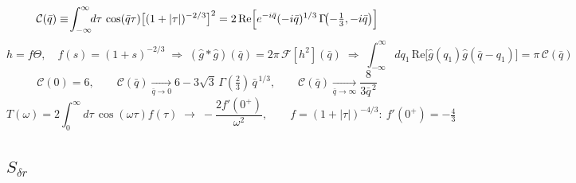 \documentclass[10pt,prd,aps,nobibnotes,superscriptaddress,preprintnumbers,notitlepage]{revtex4-1}
\begin{document}
\begin{equation}
  \mathcal{C}(\bar q)\equiv\!\int_{-\infty}^{\infty}\!\!d\tau\,\cos(\bar q\tau)
  \bigl[(1+|\tau|)^{-2/3}\bigr]^{2}
  =2\,\mathrm{Re}\Bigl[e^{-i\bar q}(-i\bar q)^{1/3}\,\Gamma\!\bigl(-\tfrac13,-i\bar q\bigr)\Bigr]
  \label{A:Cclosed}
\end{equation}
\begin{equation}
  h=f\Theta,\quad f(s)=(1+s)^{-2/3}
  \;\Longrightarrow\;
  (\hat g*\hat g)(\bar q)=2\pi\,\mathcal{F}[h^2](\bar q)
  \;\Longrightarrow\;
  \int_{-\infty}^{\infty}\!\!dq_1\,\mathrm{Re}\bigl[\hat g(q_1)\hat g(\bar q-q_1)\bigr]=\pi\,\mathcal{C}(\bar q)
  \label{A:convC}
\end{equation}
\begin{equation}
  \mathcal{C}(0)=6,
  \qquad
  \mathcal{C}(\bar q)\xrightarrow[\bar q\to0]{}6-3\sqrt3\,\Gamma(\tfrac23)\,\bar q^{\,1/3},
  \qquad
  \mathcal{C}(\bar q)\xrightarrow[\bar q\to\infty]{}\frac{8}{3\bar q^{\,2}}
  \label{A:Climits}
\end{equation}
\begin{equation}
  T(\omega)=2\!\int_0^{\infty}\!\!d\tau\,\cos(\omega\tau)f(\tau)\;\longrightarrow\;-\frac{2f'(0^+)}{\omega^2},
  \qquad
  f=(1+|\tau|)^{-4/3}:\ f'(0^+)=-\tfrac43
  \label{A:cusp}
\end{equation}

\subsection{\texorpdfstring{$S_{\delta r}$}{S\_dr}}
\label{sec:chain-white}
\end{document}
